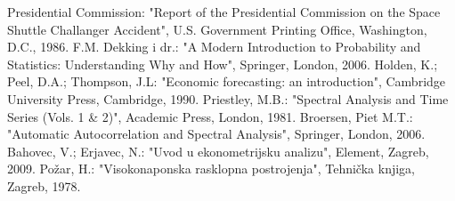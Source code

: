 \documentclass[a4paper,12pt,oneside]{memoir}
\begin{document}
    \begin{thebibliography}{9}
         Presidential Commission: "Report of the Presidential Commission on the Space Shuttle Challanger Accident", U.S. Government Printing Office, Washington, D.C., 1986.
         F.M. Dekking i dr.: "A Modern Introduction to Probability and Statistics: Understanding Why and How", Springer, London, 2006.
         Holden, K.; Peel, D.A.; Thompson, J.L: "Economic forecasting: an introduction", Cambridge University Press, Cambridge, 1990.
         Priestley, M.B.: "Spectral Analysis and Time Series (Vols. 1 \& 2)", Academic Press, London, 1981.
         Broersen, Piet M.T.: "Automatic Autocorrelation and Spectral Analysis", Springer, London, 2006.
         Bahovec, V.; Erjavec, N.: "Uvod u ekonometrijsku analizu", Element, Zagreb, 2009.
         Požar, H.: "Visokonaponska rasklopna postrojenja", Tehnička knjiga, Zagreb, 1978.
    \end{thebibliography}
\end{document}
